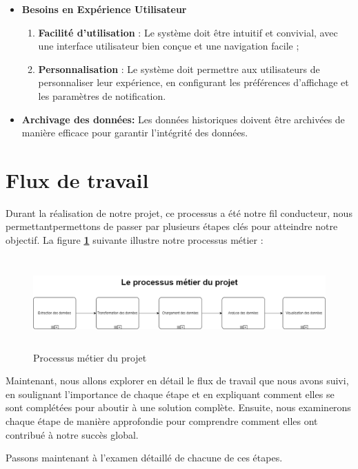 \begin{itemize}
        \item\textbf{Besoins en Expérience Utilisateur}
    
                \begin{enumerate}
                    \item[1.] \textbf{Facilité d'utilisation} : Le système doit être intuitif et convivial, avec une interface utilisateur bien conçue et une navigation facile ;
                    
                    \item[2.] \textbf{Personnalisation} : Le système doit permettre aux utilisateurs de personnaliser leur expérience, en configurant les préférences d'affichage et les paramètres de notification.
                \end{enumerate}
        \item \textbf{Archivage des données: }Les données historiques doivent être archivées de manière efficace pour garantir l'intégrité des données.
  \end{itemize}
  \section{Flux de travail}
  
  \par Durant la réalisation de notre projet, ce processus a été notre fil conducteur, nous permettantpermettons de passer par plusieurs étapes clés pour atteindre notre objectif. La figure \textbf{\ref{fig:BPMN}} suivante illustre notre processus métier :
        \begin{figure}[H]
        \centering
        \includegraphics[width=1\linewidth, height=3.5cm]{img/conception/BPMN.png}
        \caption{Processus métier du projet}
        \label{fig:BPMN}
        \end{figure}
  \par Maintenant, nous allons explorer en détail le flux de travail que nous avons suivi, en soulignant l'importance de chaque étape et en expliquant comment elles se sont complétées pour aboutir à une solution complète. Ensuite, nous examinerons chaque étape de manière approfondie pour comprendre comment elles ont contribué à notre succès global.
  \par Passons maintenant à l'examen détaillé de chacune de ces étapes.

